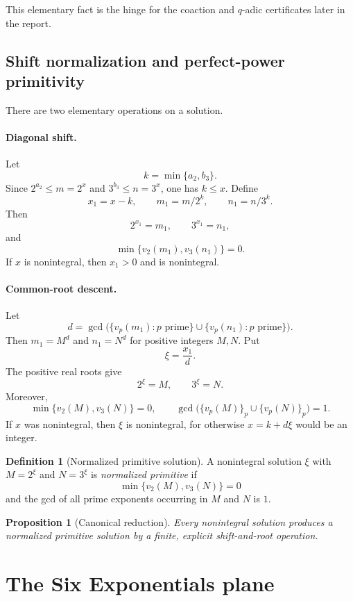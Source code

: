 \documentclass[11pt,oneside]{article}
\newtheorem{proposition}[theorem]{Proposition}
\theoremstyle{definition}
\newtheorem{definition}[theorem]{Definition}
\begin{document}
This elementary fact is the hinge for the coaction and $q$-adic certificates later in the report.

\subsection{Shift normalization and perfect-power primitivity}

There are two elementary operations on a solution.

\paragraph{Diagonal shift.}
Let
\[
  k=\min\{a_2,b_3\}.
\]
Since $2^{a_2}\le m=2^x$ and $3^{b_3}\le n=3^x$, one has $k\le x$.  Define
\[
  x_1=x-k,\qquad m_1=m/2^k,\qquad n_1=n/3^k.
\]
Then
\[
  2^{x_1}=m_1,\qquad 3^{x_1}=n_1,
\]
and
\[
  \min\{v_2(m_1),v_3(n_1)\}=0.
\]
If $x$ is nonintegral, then $x_1>0$ and is nonintegral.

\paragraph{Common-root descent.}
Let
\[
 d=\gcd\bigl(\{v_p(m_1):p\text{ prime}\}\cup
              \{v_p(n_1):p\text{ prime}\}\bigr).
\]
Then $m_1=M^d$ and $n_1=N^d$ for positive integers $M,N$.  Put
\[
  \xi=\frac{x_1}{d}.
\]
The positive real roots give
\[
  2^\xi=M,
  \qquad
  3^\xi=N.
\]
Moreover,
\[
 \min\{v_2(M),v_3(N)\}=0,
 \qquad
 \gcd\bigl(\{v_p(M)\}_p\cup\{v_p(N)\}_p\bigr)=1.
\]
If $x$ was nonintegral, then $\xi$ is nonintegral, for otherwise $x=k+d\xi$ would be an integer.

\begin{definition}[Normalized primitive solution]
A nonintegral solution $\xi$ with $M=2^\xi$ and $N=3^\xi$ is \emph{normalized primitive} if
\[
  \min\{v_2(M),v_3(N)\}=0
\]
and the gcd of all prime exponents occurring in $M$ and $N$ is $1$.
\end{definition}

\begin{proposition}[Canonical reduction]
Every nonintegral solution produces a normalized primitive solution by a finite, explicit shift-and-root operation.
\end{proposition}

\section{The Six Exponentials plane}
\end{document}
